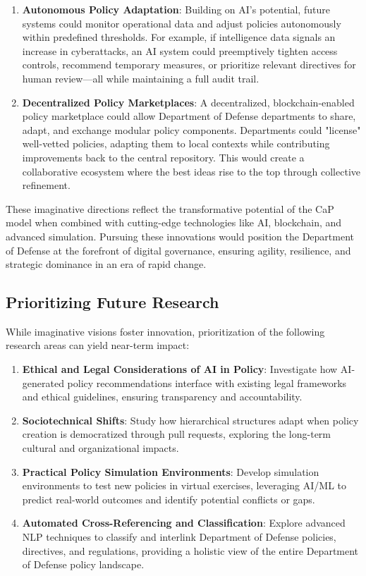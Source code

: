 \documentclass[11pt]{article}
\begin{document}
\begin{enumerate}
		\item \textbf{Autonomous Policy Adaptation}:
		Building on AI's potential, future systems could monitor operational data and adjust policies autonomously within predefined thresholds. For example, if intelligence data signals an increase in cyberattacks, an AI system could preemptively tighten access controls, recommend temporary measures, or prioritize relevant directives for human review---all while maintaining a full audit trail.

		\item \textbf{Decentralized Policy Marketplaces}:
		A decentralized, blockchain-enabled policy marketplace could allow Department of Defense departments to share, adapt, and exchange modular policy components. Departments could "license" well-vetted policies, adapting them to local contexts while contributing improvements back to the central repository. This would create a collaborative ecosystem where the best ideas rise to the top through collective refinement.
	\end{enumerate}

	These imaginative directions reflect the transformative potential of the CaP model when combined with cutting-edge technologies like AI, blockchain, and advanced simulation. Pursuing these innovations would position the Department of Defense at the forefront of digital governance, ensuring agility, resilience, and strategic dominance in an era of rapid change.



	\subsection{Prioritizing Future Research}
	While imaginative visions foster innovation, prioritization of the following research areas can yield near-term impact:
	\begin{enumerate}
		\item \textbf{Ethical and Legal Considerations of AI in Policy}: Investigate how AI-generated policy recommendations interface with existing legal frameworks and ethical guidelines, ensuring transparency and accountability.
		\item \textbf{Sociotechnical Shifts}: Study how hierarchical structures adapt when policy creation is democratized through pull requests, exploring the long-term cultural and organizational impacts.
		\item \textbf{Practical Policy Simulation Environments}: Develop simulation environments to test new policies in virtual exercises, leveraging AI/ML to predict real-world outcomes and identify potential conflicts or gaps.
		\item \textbf{Automated Cross-Referencing and Classification}: Explore advanced NLP techniques to classify and interlink Department of Defense policies, directives, and regulations, providing a holistic view of the entire Department of Defense policy landscape.
	\end{enumerate}
\end{document}
